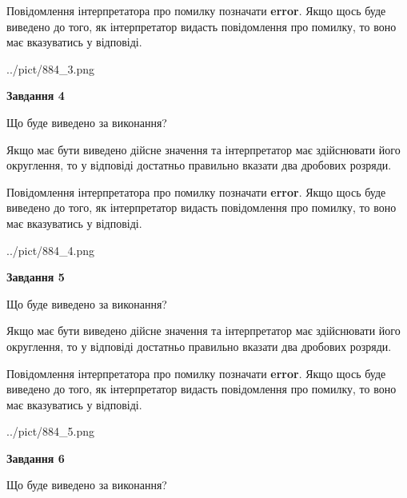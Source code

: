 \documentclass[12pt, ukrainian]{article}
\begin{document}
{\begin {Large}
Повідомлення інтерпретатора про помилку позначати \textbf{error}.
Якщо щось буде виведено до того, як інтерпретатор видасть повідомлення про помилку, 
то воно має вказуватись у відповіді. \par

\begin{center}
	{../pict/884_3.png}
\end{center}
\newpage

{\begin {center}\textbf{Завдання 4}\end {center}}\par
Що буде виведено за виконання? \par

Якщо має бути виведено дійсне значення та інтерпретатор має здійснювати його округлення, 
то у відповіді достатньо правильно вказати два дробових розряди.

Повідомлення інтерпретатора про помилку позначати \textbf{error}.
Якщо щось буде виведено до того, як інтерпретатор видасть повідомлення про помилку, 
то воно має вказуватись у відповіді. \par

\begin{center}
	{../pict/884_4.png}
\end{center}
\newpage

{\begin {center}\textbf{Завдання 5}\end {center}}\par
Що буде виведено за виконання? \par

Якщо має бути виведено дійсне значення та інтерпретатор має здійснювати його округлення, 
то у відповіді достатньо правильно вказати два дробових розряди.

Повідомлення інтерпретатора про помилку позначати \textbf{error}.
Якщо щось буде виведено до того, як інтерпретатор видасть повідомлення про помилку, 
то воно має вказуватись у відповіді. \par

\begin{center}
	{../pict/884_5.png}
\end{center}
\newpage

{\begin {center}\textbf{Завдання 6}\end {center}}\par
Що буде виведено за виконання? \par


\end{Large}}
\end{document}
